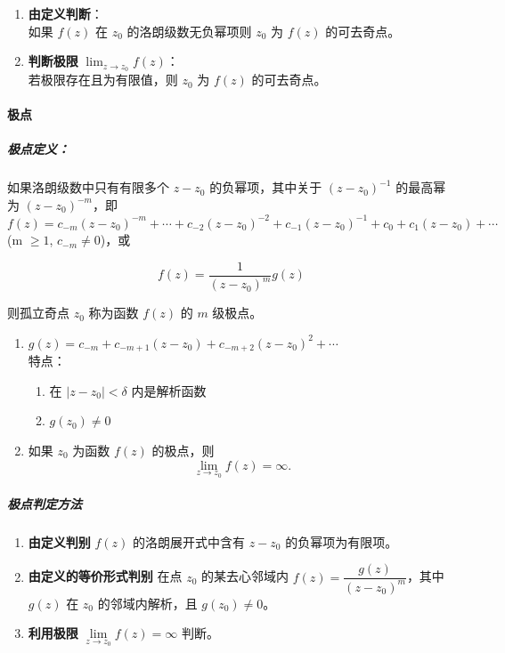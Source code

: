 \begin{tcolorbox}[title={判定方法},colback=red!5!white
,colframe=red!75!black
,colbacktitle=yellow!50!red
,coltitle=red!25!black, fonttitle=\bfseries,subtitle style={boxrule=0.4pt, colback=yellow!50!red!25!white}]
\begin{enumerate}
\item \textbf{由定义判断}：\\
如果 \(f(z)\) 在 \(z_{0}\) 的洛朗级数无负幂项则 \(z_{0}\) 为 \(f(z)\) 的可去奇点。
\item \textbf{判断极限} \(\lim_{z\to z_{0}}f(z)\)：\\
若极限存在且为有限值，则 \(z_{0}\) 为 \(f(z)\) 的可去奇点。
\end{enumerate}

\end{tcolorbox}
\paragraph{极点}
\label{极点}
\subparagraph{极点定义：}
\label{极点定义}
如果洛朗级数中只有有限多个 \(z-z_{0}\) 的负幂项，其中关于
\((z-z_{0})^{-1}\) 的最高幂为 \((z-z_{0})^{-m}\)，即
\(f(z)=c_{-m}(z-z_{0})^{-m}+\cdots+c_{-2}(z-z_{0})^{-2}+c_{-1}(z-z_{0})^{-1}+c_{0}+c_{1}(z-z_{0})+\cdots\)
(m \(\geqslant 1\), \(c_{-m}\neq 0\))，或

\[
f(z)=\frac{1}{(z-z_{0})^{m}}g(z)
\]

则孤立奇点 \(z_{0}\) 称为函数 \(f(z)\) 的 \(m\) 级极点。

\begin{tcolorbox}[title={说明},colback=red!5!white
,colframe=red!75!black
,colbacktitle=yellow!50!red
,coltitle=red!25!black, fonttitle=\bfseries,subtitle style={boxrule=0.4pt, colback=yellow!50!red!25!white}]
\begin{enumerate}
\item \(g(z)=c_{-m}+c_{-m+1}(z-z_{0})+c_{-m+2}(z-z_{0})^{2}+\cdots\) \\
特点：
\begin{enumerate}
\item 在 \(|z-z_{0}|<\delta\) 内是解析函数
\item \(g(z_{0})\neq 0\)
\end{enumerate}
\item 如果 \(z_{0}\) 为函数 \(f(z)\) 的极点，则
\[
    \lim_{z\to z_{0}}f(z)=\infty.
    \]
\end{enumerate}

\end{tcolorbox}
\subparagraph{极点判定方法}
\label{极点判定方法}
\begin{enumerate}
\item \textbf{由定义判别}
\(f(z)\) 的洛朗展开式中含有 \(z-z_{0}\) 的负幂项为有限项。
\item \textbf{由定义的等价形式判别}
在点 \(z_{0}\) 的某去心邻域内
\(f(z)=\dfrac{g(z)}{(z-z_{0})^{m}}\)，其中 \(g(z)\) 在 \(z_{0}\)
的邻域内解析，且 \(g(z_{0})\neq 0\)。
\item \textbf{利用极限} \(\lim\limits _{z\to z_{0}}f(z)=\infty\) 判断。
\end{enumerate}
